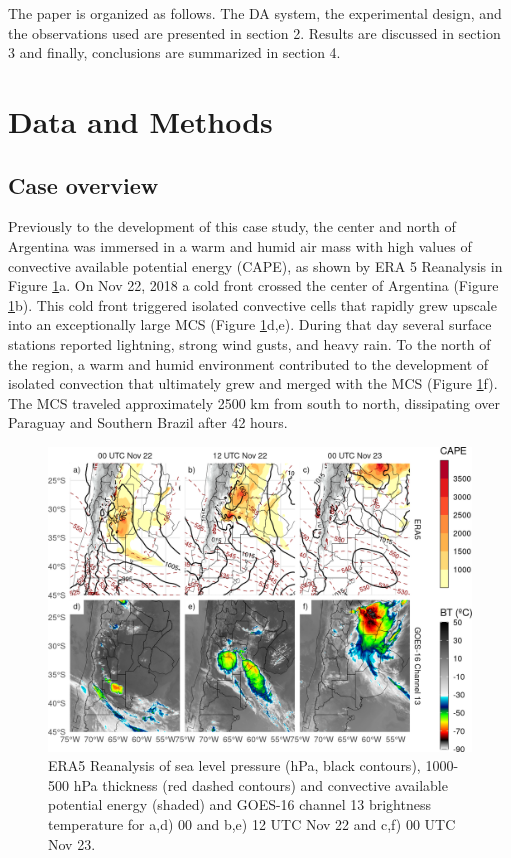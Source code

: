 \documentclass[final,5p,times,twocolumn,authoryear]{elsarticle} %
\begin{document}
The paper is organized as follows. The DA system, the experimental design, and the observations used are presented in section 2. Results are discussed in section 3 and finally, conclusions are summarized in section 4.

\hypertarget{data-and-methods}{%
\section{Data and Methods}\label{data-and-methods}}

\hypertarget{case-overview}{%
\subsection{Case overview}\label{case-overview}}

Previously to the development of this case study, the center and north of Argentina was immersed in a warm and humid air mass with high values of convective available potential energy (CAPE), as shown by ERA 5 Reanalysis \citep{era5pressure} in Figure \ref{fig:case}a. On Nov 22, 2018 a cold front crossed the center of Argentina (Figure \ref{fig:case}b). This cold front triggered isolated convective cells that rapidly grew upscale into an exceptionally large MCS (Figure \ref{fig:case}d,e). During that day several surface stations reported lightning, strong wind gusts, and heavy rain. To the north of the region, a warm and humid environment contributed to the development of isolated convection that ultimately grew and merged with the MCS (Figure \ref{fig:case}f).
The MCS traveled approximately 2500 km from south to north, dissipating over Paraguay and Southern Brazil after 42 hours.



\begin{figure}

{\centering \includegraphics{../figures/case-1} 

}

\caption{ERA5 Reanalysis of sea level pressure (hPa, black contours), 1000-500 hPa thickness (red dashed contours) and convective available potential energy (shaded) and GOES-16 channel 13 brightness temperature for a,d) 00 and b,e) 12 UTC Nov 22 and c,f) 00 UTC Nov 23.}\label{fig:case}
\end{figure}
\end{document}
